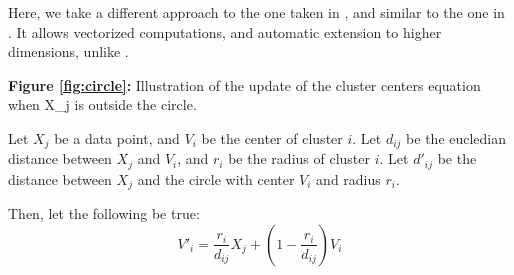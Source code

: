 \documentclass[conference]{IEEEtran}
\begin{document}
Here, we take a different approach to the one taken in \cite{308484}, and similar to the one in \cite{DAVE1992713}. It allows vectorized computations, and
automatic extension to higher dimensions, unlike \cite{308484}.

\begin{center}
\textbf{Figure \ref{fig:circle}:} Illustration of the update of the cluster centers equation when X_j is outside the circle.
\end{center}


Let $X_j$ be a data point, and $V_i$ be the center of cluster $i$. Let $d_{ij}$ be the eucledian distance between $X_j$ and $V_i$,
and $r_i$ be the radius of cluster $i$.
Let $d'_{ij}$ be the distance between $X_j$ and the circle with center $V_i$ and radius $r_i$.

Then, let the following be true:
\begin{equation}
V'_i = \frac{r_i}{d_{ij}}X_j + (1 - \frac{r_i}{d_{ij}})V_i
\end{equation}
\end{document}

